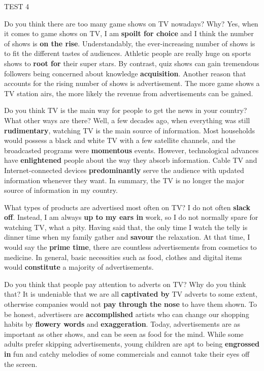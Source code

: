\begin{glossarymc}[Cambridge 11]
\begin{test}{TEST 4}
    \begin{qa}{Do you think there are too many game shows on TV nowadays? Why?}
    Yes, when it comes to game shows on TV, I am \textbf{spoilt for choice} and I think the number of shows is \textbf{on the rise}. Understandably, the ever-increasing number of shows is to fit the different tastes of audiences. Athletic people are really huge on sports shows to \textbf{root for} their super stars. By contrast, quiz shows can gain tremendous followers being concerned about knowledge \textbf{acquisition}. Another reason that accounts for the rising number of shows is advertisement. The more game shows a TV station airs, the more likely the revenue from advertisements can be gained.
    \end{qa}

    \begin{qa}{Do you think TV is the main way for people to get the news in your country? What other ways are there?}
    Well, a few decades ago, when everything was still \textbf{rudimentary}, watching TV is the main source of information. Most households would possess a black and white TV with a few satellite channels, and the broadcasted programs were \textbf{momentous} events. However, technological advances have \textbf{enlightened} people about the way they absorb information. Cable TV and Internet-connected devices \textbf{predominantly} serve the audience with updated information whenever they want. In summary, the TV is no longer the major source of information in my country.
    \end{qa}

    \begin{qa}{What types of products are advertised most often on TV?}
    I do not often \textbf{slack off}. Instead, I am always \textbf{up to my ears in} work, so I do not normally spare for watching TV, what a pity. Having said that, the only time I watch the telly is dinner time when my family gather and \textbf{savour} the relaxation. At that time, I would say the \textbf{prime time}, there are countless advertisements from cosmetics to medicine. In general, basic necessities such as food, clothes and digital items would \textbf{constitute} a majority of advertisements.
    \end{qa}

    \begin{qa}{Do you think that people pay attention to adverts on TV? Why do you think that?}
    It is undeniable that we are all \textbf{captivated by} TV adverts to some extent, otherwise companies would not \textbf{pay through the nose} to have them shown. To be honest, advertisers are \textbf{accomplished} artists who can change our shopping habits by \textbf{flowery words} and \textbf{exaggeration}. Today, advertisements are as important as other shows, and can be seen as food for the mind. While some adults prefer skipping advertisements, young children are apt to being \textbf{engrossed in} fun and catchy melodies of some commercials and cannot take their eyes off the screen.
    \end{qa}


\end{test}
\end{glossarymc}
